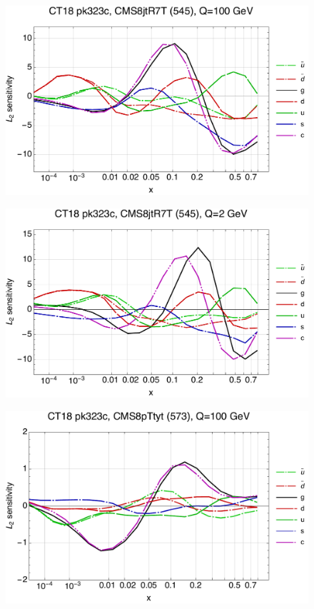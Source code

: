 \documentclass[10pt,aps,prd,floatfix,titlepage]{revtex4}
\begin{document}
\clearpage
\begin{figure}
\includegraphics[width=\textwidth,height=0.44\textheight,keepaspectratio]{1/545_ct18nn_L2_q100_Sf_1.pdf}
\caption{}
\end{figure}
\begin{figure}
\includegraphics[width=\textwidth,height=0.44\textheight,keepaspectratio]{1/545_ct18nn_L2_q2_Sf_1.pdf}
\caption{}
\end{figure}
\clearpage
\begin{figure}
\includegraphics[width=\textwidth,height=0.44\textheight,keepaspectratio]{1/573_ct18nn_L2_q100_Sf_1.pdf}
\caption{}
\end{figure}
\end{document}
